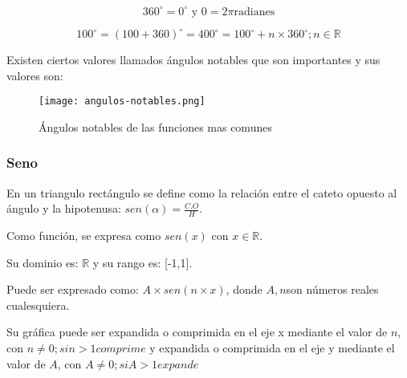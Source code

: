 $$ 360^\circ = 0^\circ \text{ y  } 0 = 2\pi \text{radianes}   $$

$$ 100^\circ = (100+360)^\circ = 400^\circ = 100^\circ + n\times360^\circ; n\in \mathbb{R} $$

Existen ciertos valores llamados ángulos notables que son importantes y sus
valores son:


    \begin{figure}[htb]
 		\centering
		\texttt{[image: angulos-notables.png]}
        \caption{Ángulos notables de las funciones mas comunes}
	\end{figure}




\subsubsection{Seno} \label{Sen}
En un triangulo rectángulo se define como la relación entre el cateto opuesto al
ángulo y la hipotenusa: $ sen(\alpha)= \frac{C.O}{H} $.

Como función, se expresa como $ sen(x) \text{ con  }x\in\mathbb{R} $.

Su dominio es: $ \mathbb{R} $ y su rango es: [-1,1].

Puede ser expresado como: $ A\times sen(n\times x) $, donde $A,n$son números reales
cualesquiera.

Su gráfica puede ser expandida o comprimida en el eje x mediante el valor de $n$,
con $ n \not = 0; si n>1 comprime $  y  expandida o comprimida en el eje y
mediante el valor de $ A $, con $ A \not = 0; si A>1 expande $

\begin{center}
\end{center}


